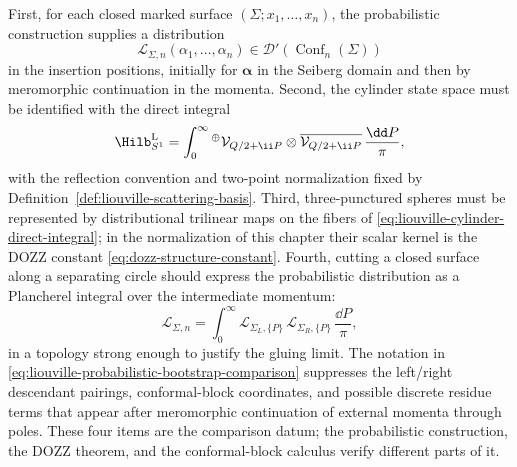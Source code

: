 First, for each closed marked surface \((\Sigma;x_1,\ldots,x_n)\), the
probabilistic construction supplies a distribution
\[
  \mathcal L_{\Sigma,n}(\alpha_1,\ldots,\alpha_n)
  \in
  \mathcal D'(\operatorname{Conf}_n(\Sigma))
\]
in the insertion positions, initially for
\(\boldsymbol\alpha\) in the Seiberg domain and then by meromorphic
continuation in the momenta.  Second, the cylinder state space must be
identified with the direct integral
\begin{equation}
  \Hilb_{S^1}^{\mathrm L}
  =
  \int_0^\infty{}^{\oplus}
  \mathcal V_{Q/2+\ii P}\otimes
  \overline{\mathcal V_{Q/2+\ii P}}\,
  \frac{\dd P}{\pi},
  \label{eq:liouville-cylinder-direct-integral}
\end{equation}
with the reflection convention and two-point normalization fixed by
Definition~\ref{def:liouville-scattering-basis}.  Third, three-punctured
spheres must be represented by distributional trilinear maps on the fibers of
\eqref{eq:liouville-cylinder-direct-integral}; in the normalization of this
chapter their scalar kernel is the DOZZ constant
\eqref{eq:dozz-structure-constant}.  Fourth, cutting a closed surface along a
separating circle should express the probabilistic distribution as a
Plancherel integral over the intermediate momentum:
\begin{equation}
  \mathcal L_{\Sigma,n}
  =
  \int_0^\infty
  \mathcal L_{\Sigma_L,\{P\}}\,
  \mathcal L_{\Sigma_R,\{P\}}\,
  \frac{\dd P}{\pi},
  \label{eq:liouville-probabilistic-bootstrap-comparison}
\end{equation}
in a topology strong enough to justify the gluing limit.  The notation in
\eqref{eq:liouville-probabilistic-bootstrap-comparison} suppresses the
left/right descendant pairings, conformal-block coordinates, and possible
discrete residue terms that appear after meromorphic continuation of external
momenta through poles.  These four items are the comparison datum; the
probabilistic construction, the DOZZ theorem, and the conformal-block
calculus verify different parts of it.

